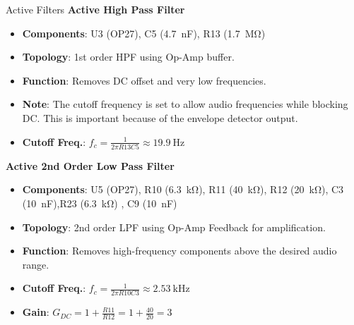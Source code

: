 \documentclass[10pt,xcolor={table,dvipsnames},t]{beamer}
\begin{document}
\begin{frame}{Active Filters}
\textbf{Active High Pass Filter}
\begin{itemize}
    \item \textbf{Components}: U3 (OP27), C5 (\SI{4.7}{\nano\farad}), R13 (\SI{1.7}{\mega\ohm})
    \item \textbf{Topology}: 1st order HPF using Op-Amp buffer.
    \item \textbf{Function}: Removes DC offset and very low frequencies.
    \item \textbf{Note}: The cutoff frequency is set to allow audio frequencies while blocking DC. This is important because of the envelope detector output.
    \item \textbf{Cutoff Freq.}: $f_c = \frac{1}{2\pi R13 C5} \approx \SI{19.9}{\hertz}$
\end{itemize}
\vspace{1em}
\textbf{Active 2nd Order Low Pass Filter}
\begin{itemize}
    \item \textbf{Components}: U5 (OP27), R10 (\SI{6.3}{\kilo\ohm}), R11 (\SI{40}{\kilo\ohm}), R12 (\SI{20}{\kilo\ohm}), C3 (\SI{10}{\nano\farad}),R23 (\SI{6.3}{\kilo\ohm}) , C9 (\SI{10}{\nano\farad})
    \item \textbf{Topology}: 2nd order LPF using Op-Amp Feedback for amplification.
    \item \textbf{Function}: Removes high-frequency components above the desired audio range.
    \item \textbf{Cutoff Freq.}: $f_c = \frac{1}{2\pi R10 C3} \approx \SI{2.53}{\kilo\hertz}$
    \item \textbf{Gain}: $G_{DC} = 1 + \frac{R11}{R12} = 1 + \frac{40}{20} = 3$
\end{itemize}



\end{frame}
\end{document}
